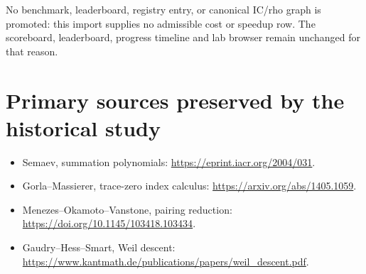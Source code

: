 \documentclass[10pt]{article}
\begin{document}
No benchmark, leaderboard, registry entry, or canonical IC/rho graph is promoted:
this import supplies no admissible cost or speedup row. The scoreboard,
leaderboard, progress timeline and lab browser remain unchanged for that reason.

\section*{Primary sources preserved by the historical study}
\begin{itemize}
\item Semaev, summation polynomials: \url{https://eprint.iacr.org/2004/031}.
\item Gorla--Massierer, trace-zero index calculus: \url{https://arxiv.org/abs/1405.1059}.
\item Menezes--Okamoto--Vanstone, pairing reduction:
\url{https://doi.org/10.1145/103418.103434}.
\item Gaudry--Hess--Smart, Weil descent:
\url{https://www.kantmath.de/publications/papers/weil_descent.pdf}.
\end{itemize}
\end{document}
